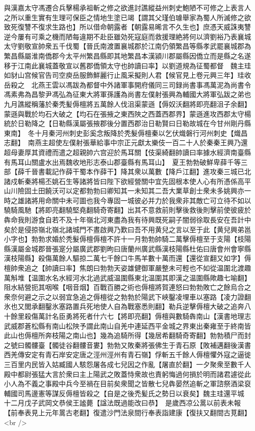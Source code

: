 與漢嘉太守馮遷合兵擊楊承祖斬之修之欲進討譙縱益州刺史鮑陋不可修之上表言人之所以重生實有生理可保臣之情地生塗已竭【謂其父瑾伯璩舉家為蜀人所滅修之欲致死復讐不復求生路也】所以借命朝露者【朝露易晞言不久生也】庶憑天威誅夷讐逆今屢有可乘之機而陋每違期不赴臣雖効死寇庭而救援理絶將何以濟劉裕乃表襄城太守劉敬宣帥衆五千伐蜀【晉氏南渡置襄城郡於江南仍領繁昌等縣孝武罷襄城郡為繁昌縣屬淮南僑郡今太平州繁昌縣即其地繁昌本漢潁川郡屬縣因僑立而是縣之名遂移于江南此襄城蓋敬宣以舊郡僑領太守也帥讀曰率】以劉道規為征蜀都督　魏主珪如豺山宫候官告司空庾岳服飾鮮麗行止風采擬則人君【候官見上卷元興三年】珪收岳殺之　北燕王雲以馮跋為都督中外諸軍事開府儀同三司録尚書事馮萬泥為尚書令馮素弗為昌黎尹馮弘為征東大將軍孫護為尚書左僕射張興為輔國大將軍弘跋之弟也　九月譙縱稱藩於秦秃髪傉檀將五萬餘人伐沮渠蒙遜【傉奴沃翻將即亮翻沮子余翻】蒙遜與戰於均石大破之【均石在張掖之東西陜之西蓋西郡界】蒙遜進攻西郡太守楊統於日勒降之【日勒縣漢屬張掖郡後分置西郡治日勒賢曰日勒故城在今甘州剛丹縣東南】　冬十月秦河州刺史彭奚念叛降於秃髮傉檀秦以乞伏熾磐行河州刺史【熾昌志翻】　南燕主超使左僕射張華給事中宗正元獻太樂伎一百二十人於秦秦王興乃還超母妻厚其資禮而遣之超親帥六宫迎於馬耳關【伎渠綺翻帥讀曰率據水經濟南臺縣有馬耳山關盧水出焉魏收地形志泰山郡臺縣有馬耳山】　夏王勃勃破鮮卑薛千等三部【薛千晉書載記作薛干蜀本作薛干】降其衆以萬數【降戶江翻】進攻秦三城已北諸戍斬秦將楊丕姚石生等諸將皆曰陛下欲經營關中宜先固根本使人心有所憑係高平山川險固土田饒沃可以定都勃勃曰卿知其一未知其二吾大業草創士衆未多姚興亦一時之雄諸將用命關中未可圖也我今專固一城彼必并力於我衆非其敵亡可立待不如以驍騎風馳【將即亮翻驍堅堯翻騎奇寄翻】出其不意救前則擊後救後則擊前使彼疲於犇命我則游食自若不及十年嶺北河東盡為我有待興既死嗣子闇弱徐取長安在吾計中矣於是侵掠嶺北嶺北諸城門不晝啟興乃歎曰吾不用黄兒之言以至于此【黄兒興弟邕小字也】勃勃求婚於秃髮傉檀傉檀不許十一月勃勃帥騎二萬擊傉檀至于支陽【枝陽縣漢屬金城郡晉張寔分屬廣武郡劉昫曰唐蘭州廣武縣漢枝陽縣杜佑曰唐會州會寧縣漢枝陽縣】殺傷萬餘人驅掠二萬七千餘口牛馬羊數十萬而還【還從宣翻又如字】傉檀帥衆追之【帥讀曰率】焦朗曰勃勃天姿雄健御軍嚴整未可輕也不如從温圍北渡趣萬斛堆【温圍水名水經河水北過武威温圍縣東北温圍其即漢之温圍縣歟趣七喻翻】阻水結營扼其咽喉【咽音烟】百戰百勝之術也傉檀將賀連怒曰勃勃敗亡之餘烏合之衆奈何避之示之以弱宜急追之傉檀從之勃勃於陽武下峽鑿凌埋車以塞路【凌力證翻氷也又閭承翻鑿氷塞路置兵死地使人自為戰塞悉則翻】勒兵逆擊傉檀大破之追奔八十餘里殺傷萬計名臣勇將死者什六七【將即亮翻】傉檀與數騎犇南山【漢書地理志武威郡蒼松縣有南山松陜予謂此南山自羌中連延西平金城之界東出秦雍至于終南皆此山也傉檀所奔枝陽之南山也】幾為追騎所得【幾居希翻騎奇寄翻】勃勃積尸而封之號曰髑髏臺【髑徒谷翻髏音婁】勃勃又敗秦將張佛生于青石原【敗補邁翻後漢書西羌傳安定有青石岸安定唐之涇州涇州有青石嶺】俘斬五千餘人傉檀懼外寇之逼徙三百里内民皆入姑臧國人駭怨屠各成七兒因之作亂【屠直於翻】一夕聚衆至數千人殿中都尉張猛大言於衆曰主上陽武之敗蓋恃衆故也責躬悔過何損於明而諸君遽從此小人為不義之事殿中兵今至禍在目前矣衆聞之皆散七兒犇晏然追斬之軍諮祭酒梁裒輔國司馬邊憲等謀反傉檀皆殺之【自是之後禿髪氏之勢日以衰矣】魏主珪還平城　十二月戊子武岡文恭侯王謐薨【諡法既過能改曰恭】　是歲西凉公暠以前表未報【前奉表見上元年暠古老翻】復遣沙門法泉間行奉表詣建康【復扶又翻間古莧翻】<br />

